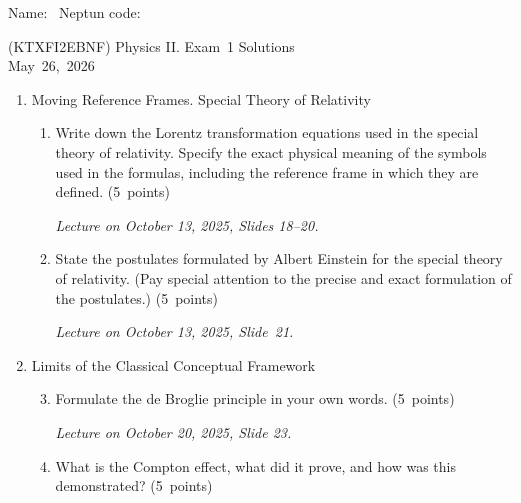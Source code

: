 \documentclass[a4paper,12pt]{letter}
\begin{document}
Name: \hrulefill\ Neptun code: \hrulefill

\bigskip

\begin{center}
(KTXFI2EBNF) Physics II. Exam~1 Solutions\\
May~26,~2026
\end{center}

\bigskip
 
\begin{enumerate}[label=\Roman*.]
   
\item Moving Reference Frames. Special Theory of Relativity

\begin{enumerate}[label=\arabic*.]
\setcounter{enumii}{0} %

\item  Write down the Lorentz transformation equations used in the special theory of relativity. Specify the exact physical meaning of the symbols used in the formulas, including the reference frame in which they are defined. \hfill (5~points)

\smallskip
\textit{Lecture on October 13, 2025, Slides 18--20.}

\item State the postulates formulated by Albert Einstein for the special theory of relativity. (Pay special attention to the precise and exact formulation of the postulates.) \hfill (5~points)

\smallskip
\textit{Lecture on October 13, 2025, Slide~21.}

\end{enumerate}


\item Limits of the Classical Conceptual Framework

\begin{enumerate}[label=\arabic*.]
\setcounter{enumii}{2} %

\item Formulate the de Broglie principle in your own words. \hfill (5~points)

\smallskip
\textit{Lecture on October 20, 2025, Slide 23.}
  
\item What is the Compton effect, what did it prove, and how was this demonstrated? \hfill (5~points)


\end{enumerate}
\end{enumerate}
\end{document}
